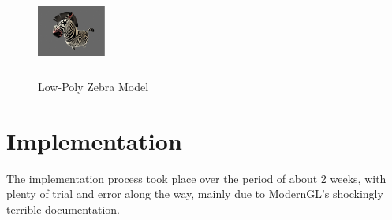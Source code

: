 \documentclass[conference]{IEEEtran}
\begin{document}
\begin{figure}[h]
    \centering
    \includegraphics[width=0.2\textwidth, height=3cm]{Images/ShittyZebra.png}
    \caption{Low-Poly Zebra Model}
    \label{fig:ShittyZebra}
\end{figure}

\section{Implementation}
The implementation process took place over the period of about 2 weeks, with plenty of trial and error along the way, mainly due to ModernGL's shockingly terrible documentation.
\end{document}
